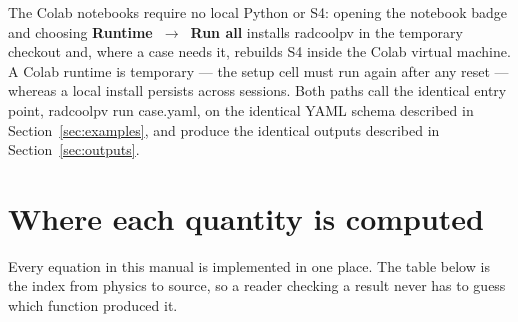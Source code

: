\documentclass[11pt,a4paper,twoside]{article}
\DeclareRobustCommand{\code}[1]{\begingroup\upshape\ttfamily
  \def\_{\allowbreak\textunderscore\allowbreak}#1\endgroup}
\begin{document}
The Colab notebooks require no local Python or S4: opening the notebook badge
and choosing \textbf{Runtime~\(\to\)~Run all} installs \code{radcoolpv} in the
temporary checkout and, where a case needs it, rebuilds S4 inside the Colab
virtual machine. A Colab runtime is temporary --- the setup cell must run again
after any reset --- whereas a local install persists across sessions. Both
paths call the identical entry point, \code{radcoolpv run case.yaml}, on the
identical YAML schema described in Section~\ref{sec:examples}, and produce the
identical outputs described in Section~\ref{sec:outputs}.

\section{Where each quantity is computed}
\label{sec:codemap}

Every equation in this manual is implemented in one place. The table below is
the index from physics to source, so a reader checking a result never has to
guess which function produced it.
\end{document}
